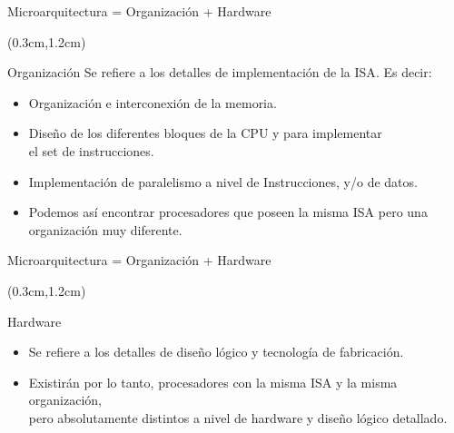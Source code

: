 \documentclass[table,dvipsnames,aspectratio=169]{beamer}
\begin{document}
\begin{frame}{Microarquitectura = Organización + Hardware}
 \begin{textblock*}{\textwidth}(0.3cm,1.2cm)
  \begin{block}{Organización} \justifying
   Se refiere a los detalles de \textcolor{furfiBlue}{implementación de la ISA}. Es decir:
   \vspace{0.1cm}
   \begin{itemize}[<+(1)->] \justifying \parskip 0.1cm
    \item Organización e interconexión de la memoria.
    \item Diseño de los diferentes bloques de la CPU y para implementar\\ el set de instrucciones.
    \item Implementación de paralelismo a nivel de Instrucciones, y/o de datos.
    \item Podemos así encontrar procesadores que poseen la misma ISA pero una\\ organización muy diferente.
   \end{itemize}
  \end{block}
 \end{textblock*}
\end{frame}

\begin{frame}{Microarquitectura = Organización + Hardware}
 \begin{textblock*}{\textwidth}(0.3cm,1.2cm)
  \begin{block}{Hardware}
   \begin{itemize}[<+(1)->]\justifying
    \item Se refiere a los \textcolor{furfiBlue}{detalles de diseño lógico} y \textcolor{furfiBlue}{tecnología de fabricación}.
    \item Existirán por lo tanto, \textcolor{furfiBlue}{procesadores con la misma ISA y la misma organización},\\
    pero absolutamente distintos a nivel de hardware y diseño lógico detallado.
   \end{itemize}
  \end{block}
  \vspace{0.3cm}
 \end{textblock*}
\end{frame}
\end{document}
